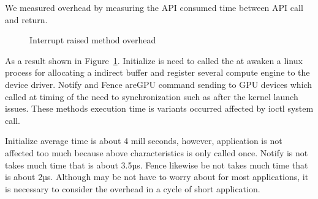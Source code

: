 We measured overhead by measuring the API consumed time between API call and return.

\begin{figure}[!t]
\begin{center}
\caption{Interrupt raised method overhead}
\label{fig:irq_rise_overhead}
\end{center}
\end{figure}

As a result shown in Figure~\ref{fig:irq_rise_overhead}.
Initialize is need to called the at awaken a linux process for allocating a indirect buffer and register several compute engine to the device driver.
Notify and Fence areGPU command sending to GPU devices which called at timing of the need to synchronization such as after the kernel launch issues.
These methods execution time is variants occurred affected by ioctl system call.

Initialize average time is about 4 mill seconds, however, application is not affected too much because above characteristics is only called once.
Notify is not takes much time that is about 3.5µs.
Fence likewise be not takes much time that is about 2µs.
Although may be not have to worry about for most applications,
it is necessary to consider the overhead in a cycle of short application.

